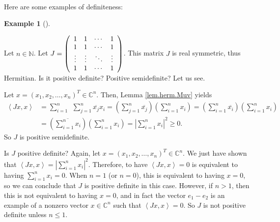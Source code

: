 \documentclass[numbers=enddot,12pt,final,onecolumn,notitlepage]{scrartcl}%
\numberwithin{exer}{subsection}
\theoremstyle{definition}
\newtheorem{exam}[theo]{Example}
\newenvironment{example}[1][]
{\begin{exam}[#1]\begin{leftbar}}
{\end{leftbar}\end{exam}}
\let\sumnonlimits\sum
\renewcommand{\sum}{\sumnonlimits\limits}
\begin{document}
Here are some examples of definiteness:

\begin{example}
Let $n\in\mathbb{N}$. Let $J=\left(
\begin{array}
[c]{cccc}%
1 & 1 & \cdots & 1\\
1 & 1 & \cdots & 1\\
\vdots & \vdots & \ddots & \vdots\\
1 & 1 & \cdots & 1
\end{array}
\right)  $. This matrix $J$ is real symmetric, thus Hermitian. Is it positive
definite? Positive semidefinite? Let us see.

Let $x=\left(  x_{1},x_{2},\ldots,x_{n}\right)  ^{T}\in\mathbb{C}^{n}$. Then,
Lemma \ref{lem.herm.Muv} yields%
\begin{align*}
\left\langle Jx,x\right\rangle  &  =\sum_{i=1}^{n}\ \ \sum_{j=1}^{n}%
\overline{x_{j}}x_{i}=\left(  \sum_{j=1}^{n}\overline{x_{j}}\right)  \left(
\sum_{i=1}^{n}x_{i}\right)  =\left(  \sum_{i=1}^{n}\overline{x_{i}}\right)
\left(  \sum_{i=1}^{n}x_{i}\right) \\
&  =\left(  \overline{\sum_{i=1}^{n}x_{i}}\right)  \left(  \sum_{i=1}^{n}%
x_{i}\right)  =\left\vert \sum_{i=1}^{n}x_{i}\right\vert ^{2}\geq0.
\end{align*}
So $J$ is positive semidefinite.

Is $J$ positive definite? Again, let $x=\left(  x_{1},x_{2},\ldots
,x_{n}\right)  ^{T}\in\mathbb{C}^{n}$. We just have shown that $\left\langle
Jx,x\right\rangle =\left\vert \sum_{i=1}^{n}x_{i}\right\vert ^{2}$. Therefore,
to have $\left\langle Jx,x\right\rangle =0$ is equivalent to having
$\sum_{i=1}^{n}x_{i}=0$. When $n=1$ (or $n=0$), this is equivalent to having
$x=0$, so we can conclude that $J$ is positive definite in this case. However,
if $n>1$, then this is not equivalent to having $x=0$, and in fact the vector
$e_{1}-e_{2}$ is an example of a nonzero vector $x\in\mathbb{C}^{n}$ such that
$\left\langle Jx,x\right\rangle =0$. So $J$ is not positive definite unless
$n\leq1$.
\end{example}
\end{document}
